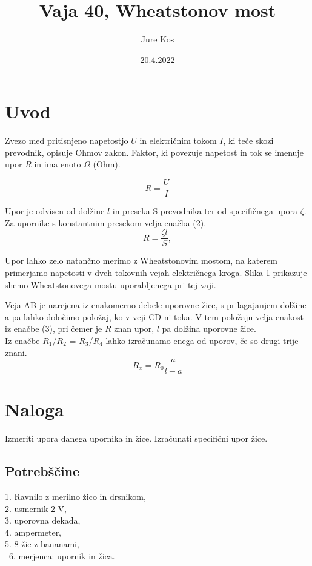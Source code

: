 \documentclass[a4paper]{report}
\author{Jure Kos}
\title{Vaja 40, Wheatstonov most}
\date{20.4.2022}
\begin{document}
\maketitle



\chapter*{Uvod}
Zvezo med pritisnjeno napetostjo $U$ in električnim tokom $I$, ki teče skozi
prevodnik, opisuje Ohmov zakon. Faktor, ki povezuje napetost in tok se
imenuje upor $R$ in ima enoto $\Omega$ (Ohm).

\begin{equation}
R=\frac{U}{I}
\end{equation}

Upor je odvisen od dolžine $l$ in preseka S prevodnika ter od specifičnega
upora $\zeta$. Za upornike s konstantnim presekom velja enačba (2).\\

\begin{equation}
R=\frac{\zeta l}{S},
\end{equation}

Upor lahko zelo natančno merimo z Wheatstonovim mostom, na katerem
primerjamo napetosti v dveh tokovnih vejah električnega kroga. Slika 1
prikazuje shemo Wheatstonovega mostu uporabljenega pri tej vaji.


Veja AB je narejena iz enakomerno debele uporovne žice, s prilagajanjem
dolžine a pa lahko določimo položaj, ko v veji CD ni toka. V tem položaju velja enakost iz enačbe (3), pri čemer je $R$ znan upor, $l$ pa dolžina uporovne žice.\\

Iz enačbe $R_1$/$R_2$ = $R_3$/$R_4$ lahko izračunamo enega od uporov, če so drugi trije znani.\\

\begin{equation}
R_x = R_0 \frac{a}{l-a}
\end{equation}


\chapter*{Naloga}

Izmeriti upora danega upornika in žice. Izračunati specifični upor žice.

\section*{Potrebščine}
1. Ravnilo z merilno žico in drsnikom,\\
2. usmernik 2 V,\\
3. uporovna dekada,\\
4. ampermeter,\\
5. 8 žic z bananami,\\\
6. merjenca: upornik in žica.\\
\end{document}
